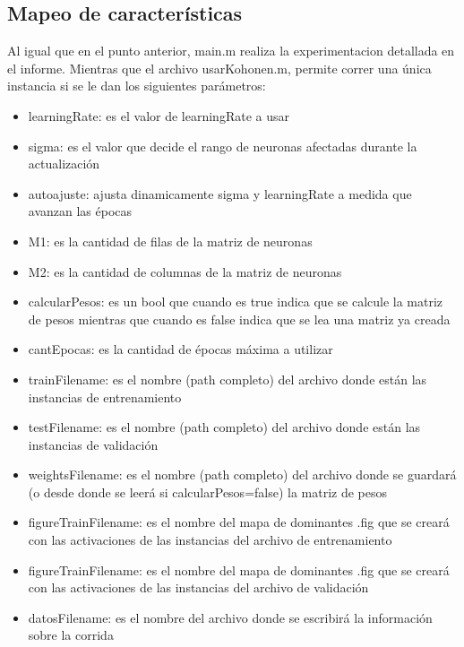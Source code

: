 \documentclass[informe.tex]{subfiles}
\begin{document}
     \newpage
     \subsection{Mapeo de características}
      Al igual que en el punto anterior, main.m realiza la experimentacion detallada en el informe. Mientras que el archivo usarKohonen.m, permite correr una \'unica instancia si se le dan los siguientes par\'ametros:
      
      \begin{itemize}
	\item learningRate: es el valor de learningRate a usar
	\item sigma: es el valor que decide el rango de neuronas afectadas durante la actualizaci\'on
	\item autoajuste: ajusta dinamicamente sigma  y learningRate a medida que avanzan las \'epocas
	\item M1: es la cantidad de filas de la matriz de neuronas
	\item M2: es la cantidad de columnas de la matriz de neuronas
	\item calcularPesos: es un bool que cuando es true indica que se calcule la matriz de pesos mientras que cuando es false indica que se lea una matriz ya creada
	\item cantEpocas: es la cantidad de \'epocas m\'axima a utilizar
	\item trainFilename: es el nombre (path completo) del archivo donde est\'an las instancias de entrenamiento
	\item testFilename: es el nombre (path completo) del archivo donde est\'an las instancias de validaci\'on
	\item weightsFilename: es el nombre (path completo) del archivo donde se guardar\'a (o desde donde se leer\'a si calcularPesos=false) la matriz de pesos
	\item figureTrainFilename: es el nombre del mapa de dominantes .fig que se crear\'a con las activaciones de las instancias del archivo de entrenamiento
	\item figureTrainFilename: es el nombre del mapa de dominantes .fig que se crear\'a con las activaciones de las instancias del archivo de validaci\'on
	\item datosFilename: es el nombre del archivo donde se escribir\'a la informaci\'on sobre la corrida
      \end{itemize}
      
    
\end{document}
